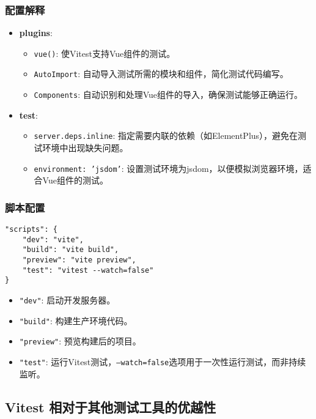 \subsubsection{配置解释}

\begin{itemize}
    \item \textbf{plugins}:
    \begin{itemize}
        \item \texttt{vue()}: 使Vitest支持Vue组件的测试。
        \item \texttt{AutoImport}: 自动导入测试所需的模块和组件，简化测试代码编写。
        \item \texttt{Components}: 自动识别和处理Vue组件的导入，确保测试能够正确运行。
    \end{itemize}
    \item \textbf{test}:
    \begin{itemize}
        \item \texttt{server.deps.inline}: 指定需要内联的依赖（如ElementPlus），避免在测试环境中出现缺失问题。
        \item \texttt{environment: 'jsdom'}: 设置测试环境为jsdom，以便模拟浏览器环境，适合Vue组件的测试。
    \end{itemize}
\end{itemize}

\subsubsection{脚本配置}

\begin{verbatim}
"scripts": {
	"dev": "vite",
	"build": "vite build",
	"preview": "vite preview",
	"test": "vitest --watch=false"
}
\end{verbatim}

\begin{itemize}
    \item \texttt{"dev"}: 启动开发服务器。
    \item \texttt{"build"}: 构建生产环境代码。
    \item \texttt{"preview"}: 预览构建后的项目。
    \item \texttt{"test"}: 运行Vitest测试，\texttt{--watch=false}选项用于一次性运行测试，而非持续监听。
\end{itemize}

\subsection{Vitest 相对于其他测试工具的优越性}

